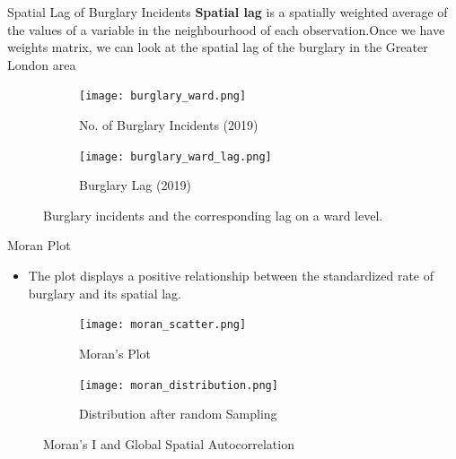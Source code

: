 \documentclass[10pt, aspectratio=169]{beamer}
\begin{document}
\begin{frame}{Spatial Lag of Burglary Incidents}
    \textbf{Spatial lag} is a spatially weighted average of the values of a
    variable in the neighbourhood of each observation.Once we have weights matrix,
    we can look at the spatial lag of the burglary in the Greater London area

    \begin{figure}
        \centering
            \begin{subfigure}[t]{0.4\textwidth}
                \texttt{[image: burglary\_ward.png]}
                \caption{No. of Burglary Incidents (2019)}\label{fig:burglary}
            \end{subfigure}
            \begin{subfigure}[t]{0.4\textwidth}
                \texttt{[image: burglary\_ward\_lag.png]}
                \caption{Burglary Lag (2019)}\label{fig:burglary_lag}
            \end{subfigure}
        \caption{Burglary incidents and the corresponding lag on a ward level.}\label{fig:lag}
    \end{figure}
\end{frame}



\begin{frame}{Moran Plot}
    \begin{itemize}
        \item \textbf{} The plot displays a positive relationship between the standardized rate of burglary and its spatial lag.
     
    \end{itemize}
    
    \begin{figure}
        \centering
            \begin{subfigure}[t]{0.4\textwidth}
                \texttt{[image: moran\_scatter.png]}
                \caption{Moran's Plot}\label{fig:moran_scatter}
            \end{subfigure}
            \begin{subfigure}[t]{0.4\textwidth}
                \texttt{[image: moran\_distribution.png]}
                \caption{Distribution after random Sampling}\label{fig:moran_distribution}
            \end{subfigure}
        \caption{Moran's I and Global Spatial Autocorrelation}\label{fig:moran}
    \end{figure}
\end{frame}
\end{document}
